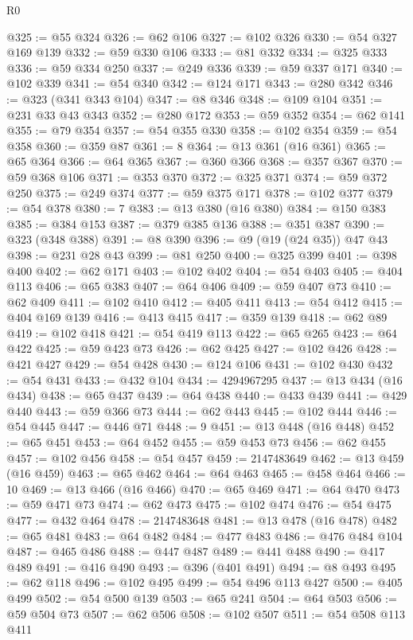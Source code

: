 \begin{lexlean}{R0}
\begin{coremodule}
@325 := @55 @324
@326 := @62 @106
@327 := @102 @326
@330 := @54 @327 @169 @139
@332 := @59 @330 @106
@333 := @81 @332
@334 := @325 @333
@336 := @59 @334 @250
@337 := @249 @336
@339 := @59 @337 @171
@340 := @102 @339
@341 := @54 @340
@342 := @124 @171
@343 := @280 @342
@346 := @323 (@341 @343 @104)
@347 := @8 @346
@348 := @109 @104
@351 := @231 @33 @43 @343
@352 := @280 @172
@353 := @59 @352
@354 := @62 @141
@355 := @79 @354
@357 := @54 @355 @330
@358 := @102 @354
@359 := @54 @358
@360 := @359 @87
@361 := 8
@364 := @13 @361 (@16 @361)
@365 := @65 @364
@366 := @64 @365
@367 := @360 @366
@368 := @357 @367
@370 := @59 @368 @106
@371 := @353 @370
@372 := @325 @371
@374 := @59 @372 @250
@375 := @249 @374
@377 := @59 @375 @171
@378 := @102 @377
@379 := @54 @378
@380 := 7
@383 := @13 @380 (@16 @380)
@384 := @150 @383
@385 := @384 @153
@387 := @379 @385 @136
@388 := @351 @387
@390 := @323 (@348 @388)
@391 := @8 @390
@396 := @9 (@19 (@24 @35)) @47 @43
@398 := @231 @28 @43
@399 := @81 @250
@400 := @325 @399
@401 := @398 @400
@402 := @62 @171
@403 := @102 @402
@404 := @54 @403
@405 := @404 @113
@406 := @65 @383
@407 := @64 @406
@409 := @59 @407 @73
@410 := @62 @409
@411 := @102 @410
@412 := @405 @411
@413 := @54 @412
@415 := @404 @169 @139
@416 := @413 @415
@417 := @359 @139
@418 := @62 @89
@419 := @102 @418
@421 := @54 @419 @113
@422 := @65 @265
@423 := @64 @422
@425 := @59 @423 @73
@426 := @62 @425
@427 := @102 @426
@428 := @421 @427
@429 := @54 @428
@430 := @124 @106
@431 := @102 @430
@432 := @54 @431
@433 := @432 @104
@434 := 4294967295
@437 := @13 @434 (@16 @434)
@438 := @65 @437
@439 := @64 @438
@440 := @433 @439
@441 := @429 @440
@443 := @59 @366 @73
@444 := @62 @443
@445 := @102 @444
@446 := @54 @445
@447 := @446 @71
@448 := 9
@451 := @13 @448 (@16 @448)
@452 := @65 @451
@453 := @64 @452
@455 := @59 @453 @73
@456 := @62 @455
@457 := @102 @456
@458 := @54 @457
@459 := 2147483649
@462 := @13 @459 (@16 @459)
@463 := @65 @462
@464 := @64 @463
@465 := @458 @464
@466 := 10
@469 := @13 @466 (@16 @466)
@470 := @65 @469
@471 := @64 @470
@473 := @59 @471 @73
@474 := @62 @473
@475 := @102 @474
@476 := @54 @475
@477 := @432 @464
@478 := 2147483648
@481 := @13 @478 (@16 @478)
@482 := @65 @481
@483 := @64 @482
@484 := @477 @483
@486 := @476 @484 @104
@487 := @465 @486
@488 := @447 @487
@489 := @441 @488
@490 := @417 @489
@491 := @416 @490
@493 := @396 (@401 @491)
@494 := @8 @493
@495 := @62 @118
@496 := @102 @495
@499 := @54 @496 @113 @427
@500 := @405 @499
@502 := @54 @500 @139
@503 := @65 @241
@504 := @64 @503
@506 := @59 @504 @73
@507 := @62 @506
@508 := @102 @507
@511 := @54 @508 @113 @411

\end{coremodule}
\end{lexlean}
